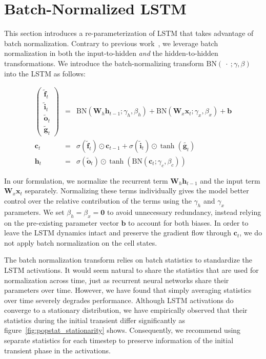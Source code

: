 \documentclass{article} %
\newcommand{\vect}[1]{\mathbf{#1}}
\newcommand{\mat}[1]{\mathbf{#1}}
\newcommand{\ewprod}{\odot}
\begin{document}
\section{Batch-Normalized LSTM}
\label{sec:recurrent-batch-normalization}

This section introduces a re-parameterization of LSTM that takes advantage of batch normalization.
Contrary to previous work~\cite{cesar, baidu}, we leverage batch normalization in both the input-to-hidden \emph{and} the hidden-to-hidden transformations.
We introduce the batch-normalizing transform $\mathrm{BN}(\ \cdot\ ; \gamma, \beta)$ into the LSTM as follows:

\begin{eqnarray}
\left(\begin{array}{ccc}
\tilde{\vect{f}}_t \\
\tilde{\vect{i}}_t \\
\tilde{\vect{o}}_t \\
\tilde{\vect{g}}_t
\end{array}\right)
 &=&
 \mathrm{BN} (\mat{W}_h \vect{h}_{t-1}; \gamma_h, \beta_h) +
 \mathrm{BN} (\mat{W}_x \vect{x}_t   ; \gamma_x, \beta_x) +
 \vect{b}
\\
\vect{c}_t &=& \sigma(\tilde{\vect{f}}_t) \ewprod \vect{c}_{t-1} +
               \sigma(\tilde{\vect{i}}_t) \ewprod \tanh(\tilde{\vect{g}_t}) \\
\vect{h}_t &=& \sigma(\tilde{\vect{o}}_t) \ewprod \tanh(
 \mathrm{BN} (\vect{c}_t; \gamma_c, \beta_c)
)
\end{eqnarray}



In our formulation, we normalize the recurrent term $\mat{W}_h \vect{h}_{t-1}$ and the input term $\mat{W}_x \vect{x}_t$ separately.
Normalizing these terms individually gives the model better control over the relative contribution of the terms using the $\gamma_h$ and $\gamma_x$ parameters.
We set $\beta_h = \beta_x = \vect{0}$ to avoid unnecessary redundancy, instead relying on the pre-existing parameter vector $\vect{b}$ to account for both biases.
In order to leave the LSTM dynamics intact and preserve the gradient flow through $\vect{c}_t$, we do not apply batch normalization on the cell states.


The batch normalization transform relies on batch statistics to standardize the LSTM activations.
It would seem natural to share the statistics that are used for normalization across time,
just as recurrent neural networks share their parameters over time.
However, we have found that simply averaging statistics over time severely degrades performance.
Although LSTM activations do converge to a stationary distribution, we have empirically observed that their statistics during the initial transient differ significantly as figure~\ref{fig:popstat_stationarity} shows.
Consequently, we recommend using separate statistics for each timestep to preserve
information of the initial transient phase in the activations.
\end{document}
